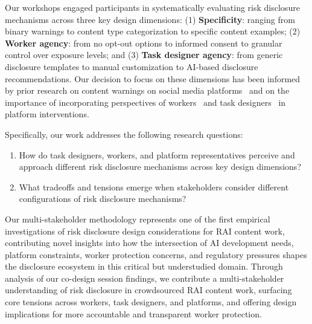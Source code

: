 Our workshops engaged participants in systematically evaluating risk disclosure mechanisms across three key design dimensions: (1) \textbf{Specificity}: ranging from binary warnings to content type categorization to specific content examples; (2) \textbf{Worker agency}: from no opt-out options to informed consent to granular control over exposure levels; and (3) \textbf{Task designer agency}: from generic disclosure templates to manual customization to AI-based disclosure recommendations. Our decision to focus on these dimensions has been informed by prior research on content warnings on social media platforms~\cite {Zhang2024PerceptionsTriggerWarnings, vit2025use} and on the importance of incorporating perspectives of workers~\cite{salehi2018ink,salehi2015we} and task designers~\cite{qian2025locating, gutheim2012fantasktic, bragg2018sprout} in platform interventions. 


Specifically, our work addresses the following research questions:
\begin{enumerate}
  \item How do task designers, workers, and platform representatives perceive and approach different risk disclosure mechanisms across key design dimensions? 
  \item What tradeoffs and tensions emerge when stakeholders consider different configurations of risk disclosure mechanisms?  
\end{enumerate}

Our multi-stakeholder methodology represents one of the first empirical investigations of risk disclosure design considerations for RAI content work, contributing novel insights into how the intersection of AI development needs, platform constraints, worker protection concerns, and regulatory pressures shapes the disclosure ecosystem in this critical but understudied domain. Through analysis of our co-design session findings, we contribute a multi-stakeholder understanding of risk disclosure in crowdsourced RAI content work, surfacing core tensions across workers, task designers, and platforms, and offering design implications for more accountable and transparent worker protection.


